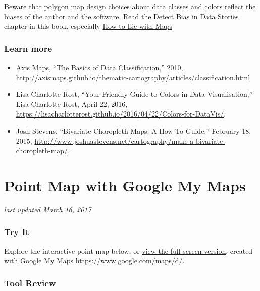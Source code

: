 \documentclass[
  english,
]{book}
\providecommand{\tightlist}{%
  \setlength{\itemsep}{0pt}\setlength{\parskip}{0pt}}
\begin{document}
Beware that polygon map design choices about data classes and colors reflect the biases of the author and the software. Read the \href{detect.html}{Detect Bias in Data Stories} chapter in this book, especially \href{detect.html\#how-to-lie-with-maps}{How to Lie with Maps}

\hypertarget{learn-more-11}{%
\subsubsection*{Learn more}\label{learn-more-11}}

\begin{itemize}
\tightlist
\item
  Axis Maps, ``The Basics of Data Classification,'' 2010, \url{http://axismaps.github.io/thematic-cartography/articles/classification.html}
\item
  Lisa Charlotte Rost, ``Your Friendly Guide to Colors in Data Visualisation,'' Lisa Charlotte Rost, April 22, 2016, \url{https://lisacharlotterost.github.io/2016/04/22/Colors-for-DataVis/}.
\item
  Josh Stevens, ``Bivariate Choropleth Maps: A How-To Guide,'' February 18, 2015, \url{http://www.joshuastevens.net/cartography/make-a-bivariate-choropleth-map/}.
\end{itemize}

\hypertarget{mymaps}{%
\section{Point Map with Google My Maps}\label{mymaps}}

\emph{last updated March 16, 2017}

\hypertarget{try-it-2}{%
\subsubsection*{Try It}\label{try-it-2}}

Explore the interactive point map below, or \href{https://drive.google.com/open?id=1OPrulm2ISYUb990DJOCoYlt_sWc}{view the full-screen version}, created with Google My Maps \url{https://www.google.com/maps/d/}.

\hypertarget{tool-review-2}{%
\subsubsection*{Tool Review}\label{tool-review-2}}
\end{document}
